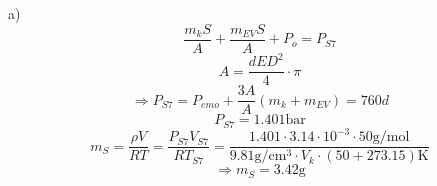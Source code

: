 a)
\[
\frac{m_k S}{A} + \frac{m_{E V} S}{A} + P_o = P_{S7}
\]
\[
A = \frac{dE D^2}{4} \cdot \pi
\]
\[
\Rightarrow P_{S7} = P_{emo} + \frac{3A}{A} (m_k + m_{EV}) = 760 d
\]
\[
P_{S7} = 1.401 \text{bar}
\]
\[
m_S = \frac{\rho V}{R T} = \frac{P_{S7} V_{S7}}{R T_{S7}} = \frac{1.401 \cdot 3.14 \cdot 10^{-3} \cdot 50 \text{g/mol}}{9.81 \text{g} / \text{cm}^3 \cdot V_k \cdot (50 + 273.15) \text{K}}
\]
\[
\Rightarrow m_S = 3.42 \text{g}
\]